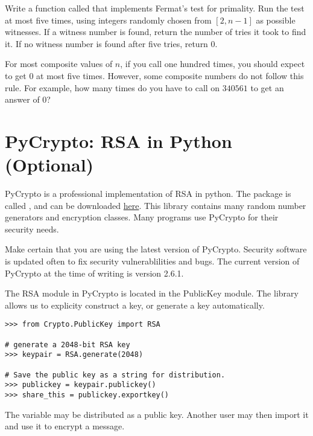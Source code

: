 \begin{problem}
Write a function called  that implements Fermat's test for primality.
Run the test at most five times, using integers randomly chosen from $[2, n-1]$ as possible witnesses.
If a witness number is found, return the number of tries it took to find it.
If no witness number is found after five tries, return $0$.

For most composite values of $n$, if you call  one hundred times, you should expect to get $0$ at most five times.
However, some composite numbers do not follow this rule. 
For example, how many times do you have to call  on $340561$ to get an answer of $0$?
\label{prob:prime_confidence}
\end{problem}

\section*{PyCrypto: RSA in Python (Optional)}

PyCrypto is a professional implementation of RSA in python.
The package is called , and can be downloaded \href{https://pypi.python.org/pypi/pycrypto}{here}.
This library contains many random number generators and encryption classes.
Many programs use PyCrypto for their security needs.

\begin{warn}
Make certain that you are using the latest version of PyCrypto.
Security software is updated often to fix security vulnerablilities and bugs.
The current version of PyCrypto at the time of writing is version 2.6.1.
\end{warn}

The RSA module in PyCrypto is located in the PublicKey module.
The library allows us to explicity construct a key, or generate a key automatically.
\begin{lstlisting}
>>> from Crypto.PublicKey import RSA

# generate a 2048-bit RSA key
>>> keypair = RSA.generate(2048)

# Save the public key as a string for distribution.
>>> publickey = keypair.publickey()
>>> share_this = publickey.exportkey()
\end{lstlisting}

The  variable may be distributed as a public key.
Another user may then import it and use it to encrypt a message.

